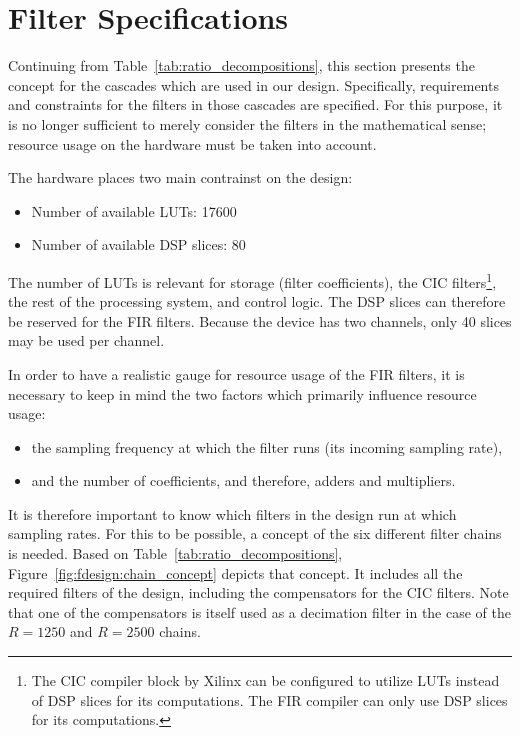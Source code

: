 \section{Filter Specifications} %
\label{sec:fdesign:filter_specifications}

Continuing  from Table~\ref{tab:ratio_decompositions},  this section  presents
the  concept for  the cascades  which  are used  in our  design. Specifically,
requirements and constraints for the  filters in those cascades are specified.
For this purpose, it is no longer sufficient to merely consider the filters in
the mathematical  sense; resource  usage on  the hardware  must be  taken into
account.

The hardware places two main contrainst on the design:
\begin{itemize}\tightlist
    \item
        Number of available LUTs: \num{17600}
    \item
        Number of available DSP slices: \num{80}
\end{itemize}
The number  of LUTs  is relevant  for storage  (filter coefficients),  the CIC
filters\footnote{%
    The CIC compiler block by Xilinx can be configured to utilize LUTs instead
    of DSP  slices for  its computations. The  FIR compiler  can only  use DSP
    slices for its computations.%
},
the  rest of  the processing  system, and  control logic. The  DSP slices  can
therefore  be  reserved  for  the  FIR filters. Because  the  device  has  two
channels, only 40 slices may be used per channel.

In order to have  a realistic gauge for resource usage of  the FIR filters, it
is  necessary to  keep  in  mind the  two  factors  which primarily  influence
resource usage:
\begin{itemize}\tightlist
    \item
        the sampling frequency at which the filter runs (its incoming sampling
        rate),
    \item
         and the number of coefficients, and therefore, adders and multipliers.
\end{itemize}
It is  therefore important to  know which filters in  the design run  at which
sampling  rates. For this  to  be possible,  a concept  of  the six  different
filter  chains   is  needed. Based   on  Table~\ref{tab:ratio_decompositions},
Figure~\ref{fig:fdesign:chain_concept} depicts  that concept. It  includes all
the required  filters of the  design, including  the compensators for  the CIC
filters. Note that  one of  the compensators  is itself  used as  a decimation
filter in the case of the $R=1250$ and $R=2500$ chains.

